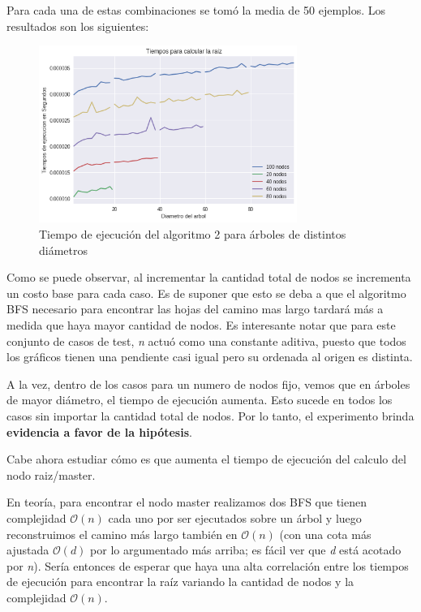 \documentclass[a4paper]{report}
\begin{document}
Para cada una de estas combinaciones se tomó la media de 50 ejemplos. Los resultados son los siguientes:

\begin{figure}[h!]
    \centering
    \includegraphics[width=0.75\textwidth]{tiempoRaizDeArboles.png}
    \caption{Tiempo de ejecución del algoritmo 2 para árboles de distintos diámetros}
    \label{fig:tiempoarboles}
\end{figure}

Como se puede observar, al incrementar la cantidad total de nodos se incrementa un costo base para cada caso. Es de suponer que esto se deba a que el algoritmo BFS necesario para encontrar las hojas del camino mas largo tardará más a medida que haya mayor cantidad de nodos. Es interesante notar que para este conjunto de casos de test, \textit{n} actuó como una constante aditiva, puesto que todos los gráficos tienen una pendiente casi igual pero su ordenada al origen es distinta.

A la vez, dentro de los casos para un numero de nodos fijo, vemos que en árboles de mayor diámetro, el tiempo de ejecución aumenta. Esto sucede en todos los casos sin importar la cantidad total de nodos. Por lo tanto, el experimento brinda \textbf{evidencia a favor de la hipótesis}.

Cabe ahora estudiar cómo es que aumenta el tiempo de ejecución del calculo del nodo raiz/master.

En teoría, para encontrar el nodo master realizamos dos BFS que tienen complejidad $\mathcal{O}(n)$ cada uno por ser ejecutados sobre un árbol y luego reconstruimos el camino más largo también en $\mathcal{O}(n)$ (con una cota más ajustada $\mathcal{O}(d)$ por lo argumentado más arriba; es fácil ver que \textit{d} está acotado por \textit{n}). Sería entonces de esperar que haya una alta correlación entre los tiempos de ejecución para encontrar la raíz variando la cantidad de nodos y la complejidad $\mathcal{O}(n)$.
\end{document}
